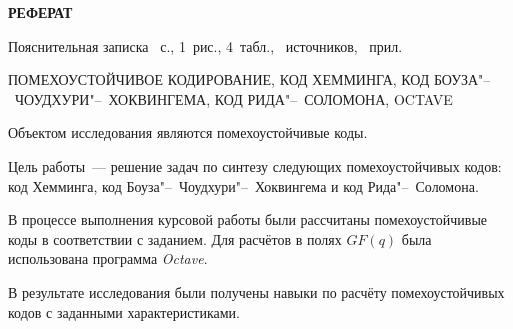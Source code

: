 \begin{center}
  \Large{\textbf{РЕФЕРАТ}}
\end{center}

Пояснительная записка ~с., 1~рис.,
4~табл., ~источников,
~прил.

ПОМЕХОУСТОЙЧИВОЕ КОДИРОВАНИЕ, КОД ХЕММИНГА, КОД
БОУЗА"--~ЧОУДХУРИ"--~ХОКВИНГЕМА, КОД РИДА"--~СОЛОМОНА, OCTAVE

Объектом исследования являются помехоустойчивые коды.

Цель работы~--- решение задач по синтезу следующих помехоустойчивых
кодов: код Хемминга, код Боуза"--~Чоудхури"--~Хоквингема и код
Рида"--~Соломона.

В процессе выполнения курсовой работы были рассчитаны помехоустойчивые
коды в соответствии с заданием. Для расчётов в полях $GF(q)$ была
использована программа \textit{Octave}.

В результате исследования были получены навыки по расчёту
помехоустойчивых кодов с заданными характеристиками.
\newpage


